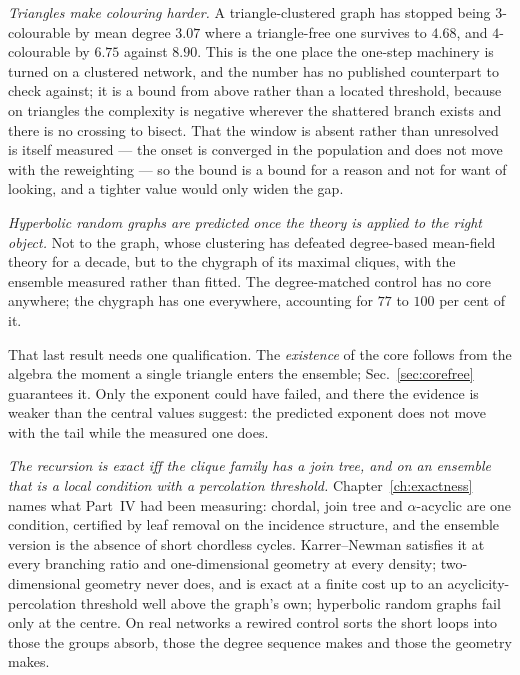 \emph{Triangles make colouring harder.} A triangle-clustered graph has stopped
being $3$-colourable by mean degree $3.07$ where a triangle-free one survives to
$4.68$, and $4$-colourable by $6.75$ against $8.90$. This is the one place the
one-step machinery is turned on a clustered network, and the number has no
published counterpart to check against; it is a bound from above rather than a
located threshold, because on triangles the complexity is negative wherever the
shattered branch exists and there is no crossing to bisect. That the window is
absent rather than unresolved is itself measured --- the onset is converged in
the population and does not move with the reweighting --- so the bound is a
bound for a reason and not for want of looking, and a tighter value would only
widen the gap.

\emph{Hyperbolic random graphs are predicted once the theory is applied to the
right object.} Not to the graph, whose clustering has defeated degree-based
mean-field theory for a decade, but to the chygraph of its maximal cliques, with
the ensemble measured rather than fitted. The degree-matched control has no core
anywhere; the chygraph has one everywhere, accounting for $77$ to $100$ per cent
of it.

That last result needs one qualification. The \emph{existence} of the core
follows from the algebra the moment a single triangle enters the ensemble;
Sec.~\ref{sec:corefree} guarantees it. Only the exponent could have failed, and
there the evidence is weaker than the central values suggest: the predicted
exponent does not move with the tail while the measured one does.

\emph{The recursion is exact iff the clique family has a join tree, and on
an ensemble that is a local condition with a percolation threshold.}
Chapter~\ref{ch:exactness} names what Part~IV had been measuring: chordal,
join tree and $\alpha$-acyclic are one condition, certified by leaf removal
on the incidence structure, and the ensemble version is the absence of short
chordless cycles. Karrer--Newman satisfies it at every branching ratio and
one-dimensional geometry at every density; two-dimensional geometry never
does, and is exact at a finite cost up to an acyclicity-percolation
threshold well above the graph's own; hyperbolic random graphs fail only at
the centre. On real networks a rewired control sorts the short loops into
those the groups absorb, those the degree sequence makes and those the
geometry makes.

